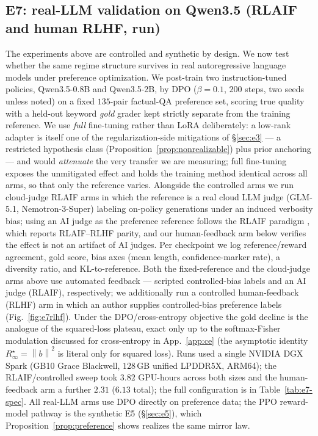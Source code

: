 \documentclass[10pt]{article} %
\theoremstyle{plain}
\theoremstyle{remark}
\newcommand{\norm}[1]{\left\lVert #1 \right\rVert}
\begin{document}
\subsection{E7: real-LLM validation on Qwen3.5 (RLAIF and human RLHF, run)}
\label{sec:e7}
The experiments above are controlled and synthetic by design. We now test whether the same regime structure survives in real autoregressive language models under preference optimization. We post-train two instruction-tuned policies, Qwen3.5-0.8B and Qwen3.5-2B, by DPO ($\beta=0.1$, $200$ steps, two seeds unless noted) on a fixed $135$-pair factual-QA preference set, scoring true quality with a held-out keyword \emph{gold} grader kept strictly separate from the training reference. We use \emph{full} fine-tuning rather than LoRA deliberately: a low-rank adapter is itself one of the regularization-side mitigations of \S\ref{sec:e3} --- a restricted hypothesis class (Proposition~\ref{prop:nonrealizable}) plus prior anchoring --- and would \emph{attenuate} the very transfer we are measuring; full fine-tuning exposes the unmitigated effect and holds the training method identical across all arms, so that only the reference varies. Alongside the controlled arms we run cloud-judge RLAIF arms in which the reference is a real cloud LLM judge (GLM-5.1, Nemotron-3-Super) labeling on-policy generations under an induced verbosity bias; using an AI judge as the preference reference follows the RLAIF paradigm \citep{lee2023}, which reports RLAIF--RLHF parity, and our human-feedback arm below verifies the effect is not an artifact of AI judges. Per checkpoint we log reference/reward agreement, gold score, bias axes (mean length, confidence-marker rate), a diversity ratio, and KL-to-reference. Both the fixed-reference and the cloud-judge arms above use automated feedback --- scripted controlled-bias labels and an AI judge (RLAIF), respectively; we additionally run a controlled human-feedback (RLHF) arm in which an author supplies controlled-bias preference labels (Fig.~\ref{fig:e7rlhf}). Under the DPO/cross-entropy objective the gold decline is the analogue of the squared-loss plateau, exact only up to the softmax-Fisher modulation discussed for cross-entropy in App.~\ref{app:ce} (the asymptotic identity $R^\star_\infty=\norm{b}^2$ is literal only for squared loss). Runs used a single NVIDIA DGX Spark (GB10 Grace Blackwell, $128$\,GB unified LPDDR5X, ARM64); the RLAIF/controlled sweep took $3.82$ GPU-hours across both sizes and the human-feedback arm a further $2.31$ ($6.13$ total); the full configuration is in Table~\ref{tab:e7-spec}. All real-LLM arms use DPO directly on preference data; the PPO reward-model pathway is the synthetic E5 (\S\ref{sec:e5}), which Proposition~\ref{prop:preference} shows realizes the same mirror law.
\end{document}
